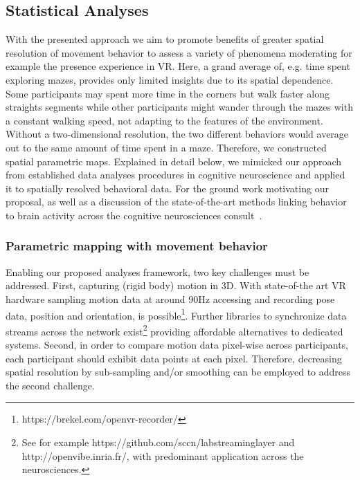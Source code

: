 \subsection{Statistical Analyses}
With the presented approach we aim to promote benefits of greater spatial resolution of movement behavior to assess a variety of phenomena moderating for example the presence experience in VR. Here, a grand average of, e.g. time spent exploring mazes, provides only limited insights due to its spatial dependence. Some participants may spent more time in the corners but walk faster along straights segments while other participants might wander through the mazes with a constant walking speed, not adapting to the features of the environment. Without a two-dimensional resolution, the two different behaviors would average out to the same amount of time spent in a maze. Therefore, we constructed spatial parametric maps. Explained in detail below, we mimicked our approach from established data analyses procedures in cognitive neuroscience and applied it to spatially resolved behavioral data. For the ground work motivating our proposal, as well as a discussion of the state-of-the-art methods linking behavior to brain activity across the cognitive neurosciences consult~\cite{Friston1994b, Bridwell2018a}.

\subsubsection{Parametric mapping with movement behavior}
Enabling our proposed analyses framework, two key challenges must be addressed. First, capturing (rigid body) motion in 3D. With state-of-the art VR hardware sampling motion data at around 90Hz accessing and recording pose data, position and orientation, is possible\footnote{https://brekel.com/openvr-recorder/}. Further libraries to synchronize data streams across the network exist\footnote{See for example https://github.com/sccn/labstreaminglayer and http://openvibe.inria.fr/, with predominant application across the neurosciences.} providing affordable alternatives to dedicated systems. Second, in order to compare motion data pixel-wise across participants, each participant should exhibit data points at each pixel. Therefore, decreasing spatial resolution by sub-sampling and/or smoothing can be employed to address the second challenge.

